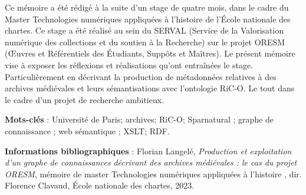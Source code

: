 \medskip
Ce mémoire a été rédigé à la suite d'un stage de quatre mois, dans le cadre du Master Technologies numériques appliquées à l’histoire de l’École nationale des chartes. Ce stage a été réalisé au sein du SERVAL (Service de la Valorisation numérique des collections et du soutien à la Recherche) sur le projet ORESM
(Œuvres et Référentiels des Étudiants, Suppôts et Maîtres). Le présent mémoire vise à exposer les réflexions et réalisations qu'ont entraînées le stage. Particulièrement en décrivant la production de métadonnées relatives à des archives médiévales et leurs sémantisations avec l'ontologie RiC-O. Le tout dans le cadre d'un projet de recherche ambitieux.

\bigskip
\textbf{Mots-clés }: Université de Paris; archives; RiC-O; Sparnatural ; graphe de connaissance ; web sémantique ; XSLT; RDF.

\bigskip
\textbf{Informations bibliographiques} : Florian Langelé, \textit{Production et exploitation d’un graphe de connaissances décrivant des archives médiévales : le cas du projet ORESM}, mémoire de master \og  Technologies numériques appliquées à l’histoire \fg  , dir. Florence Clavaud, École nationale des chartes, 2023.